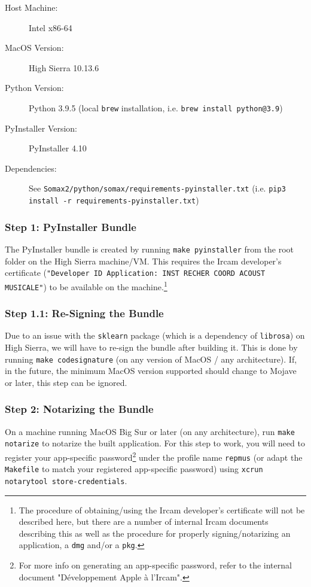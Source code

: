 \begin{description}
	\item [Host Machine:] Intel x86-64
	\item [MacOS Version:] High Sierra 10.13.6
	\item [Python Version:] Python 3.9.5 (local \texttt{brew} installation, i.e. \texttt{brew install python@3.9})
	\item [PyInstaller Version:] PyInstaller 4.10
	\item [Dependencies:] See \texttt{Somax2/python/somax/requirements-pyinstaller.txt} (i.e. \texttt{pip3 install -r requirements-pyinstaller.txt})
\end{description}

\subsubsection{Step 1: PyInstaller Bundle}
The PyInstaller bundle is created by running \texttt{make pyinstaller} from the root folder on the High Sierra machine/VM. This requires the Ircam developer's certificate (\texttt{"Developer ID Application: INST RECHER COORD ACOUST MUSICALE"}) to be available on the machine.\footnote{The procedure of obtaining/using the Ircam developer's certificate will not be described here, but there are a number of internal Ircam documents describing this as well as the procedure for properly signing/notarizing an application, a \texttt{dmg} and/or a \texttt{pkg}.} 

\subsubsection{Step 1.1: Re-Signing the Bundle}
Due to an issue with the \texttt{sklearn} package (which is a dependency of \texttt{librosa}) on High Sierra, we will have to re-sign the bundle after building it. This is done by running \texttt{make codesignature} (on any version of MacOS / any architecture). If, in the future, the minimum MacOS version supported should change to Mojave or later, this step can be ignored.

\subsubsection{Step 2: Notarizing the Bundle}
On a machine running MacOS Big Sur or later (on any architecture), run \texttt{make notarize} to notarize the built application. For this step to work, you will need to register your app-specific password\footnote{For more info on generating an app-specific password, refer to the internal document "Développement Apple à l’Ircam".} under the profile name \texttt{repmus} (or adapt the \texttt{Makefile} to match your registered app-specific password) using \texttt{xcrun notarytool store-credentials}.

